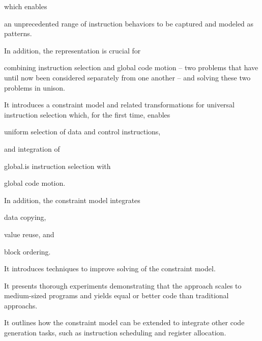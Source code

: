 \begin{contributions}
\begin{contributions}
    \end{contributions}
    which enables
    \begin{contributions}[resume]
      \item {}
        an unprecedented range of instruction behaviors to be captured and
        modeled as \glspl{pattern}.
    \end{contributions}
    In addition, the representation is crucial for
    \begin{contributions}[resume]
      \item {}
        combining \gls{instruction selection} and \gls{global code motion} --
        two problems that have until now been considered separately from one
        another -- and solving these two problems in unison.
    \end{contributions}
  \item {}
    It introduces a \gls{constraint model} and related transformations for
    \gls{universal instruction selection} which, for the first time, enables
    \begin{contributions}
      \item {}
        uniform selection of data and control \glspl{instruction},
    \end{contributions}
    and integration of
    \begin{contributions}[resume]
      \item {}
        \gls{global.is} \gls{instruction selection} with
      \item {}
        \gls{global code motion}.
    \end{contributions}
    In addition, the \gls{constraint model} integrates
    \begin{contributions}[resume]
      \item {}
        \gls{data copying},
      \item {}
        \gls{value reuse}, and
      \item {}
        \gls{block ordering}.
    \end{contributions}
  \item {}
    It introduces techniques to improve solving of the \gls{constraint model}.
  \item {}
    It presents thorough experiments demonstrating that the approach scales to
    medium-sized \glspl{program} and yields equal or better code than
    \glspl{traditional approach}.
  \item {}
    It outlines how the \gls{constraint model} can be extended to integrate
    other \gls{code generation} tasks, such as \gls{instruction scheduling} and
    \gls{register allocation}.
\end{contributions}
